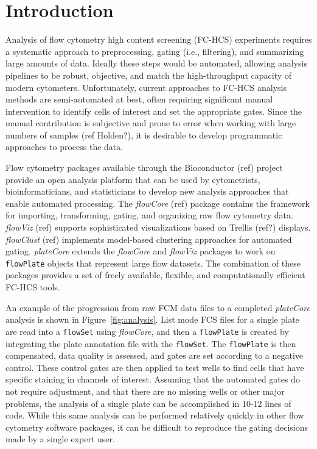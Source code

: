 \documentclass[12pt]{article}
\newcommand{\Robject}[1]{{\texttt{#1}}}
\newcommand{\Rpackage}[1]{{\textit{#1}}}
\begin{document}
\clearpage
\section*{Introduction}
Analysis of flow cytometry high content screening (FC-HCS) experiments requires a systematic approach to
preprocessing, gating (i.e., filtering), and summarizing large amounts of data. Ideally these steps would be automated,
allowing analysis pipelines to be robust, objective, and match the high-throughput capacity of modern cytometers. 
Unfortunately, current approaches to FC-HCS analysis methods are semi-automated at best,
often requiring significant manual intervention to identify cells of interest and set the appropriate gates. 
Since the manual contribution is subjective and prone to error when working with large numbers of samples (ref Holden?), it
is desirable to develop programmatic approaches to process the data.

Flow cytometry packages available through the Bioconductor (ref) project provide an open analysis platform that
can be used by cytometrists, bioinformaticians, and statisticians to develop new analysis approaches that
enable automated processing. The \Rpackage{flowCore} (ref) package contains the framework for importing, transforming, gating, and
organizing raw flow cytometry data. \Rpackage{flowViz} (ref) supports sophisticated visualizations based on Trellis (ref?) displays. 
\Rpackage{flowClust} (ref) implements model-based clustering approaches for automated gating. \Rpackage{plateCore}
extends the \Rpackage{flowCore} and \Rpackage{flowViz} packages to work on \Robject{flowPlate} objects that represent
large flow datasets. The combination of these packages provides a set of freely available, flexible, and computationally efficient FC-HCS tools. 

An example of the progression from raw FCM data files to a completed \Rpackage{plateCore} analysis is shown in Figure~\ref{fig:analysis}.
List mode FCS files for a single plate are read into a \Robject{flowSet} using \Rpackage{flowCore}, and then a \Robject{flowPlate} is created by integrating
the plate annotation file with the \Robject{flowSet}. The \Robject{flowPlate} is then compensated, data quality is assessed, and gates
are set according to a negative control. These control gates are then applied to test wells to find cells that have specific staining
in channels of interest. Assuming that the automated gates do not require adjustment, and that there are no missing wells or other major problems,
the analysis of a single plate can be accomplished in 10-12 lines of code. While this same analysis can be performed relatively quickly in 
other flow cytometry software packages, it can be difficult to reproduce the gating decisions made by a single expert user.
\end{document}
